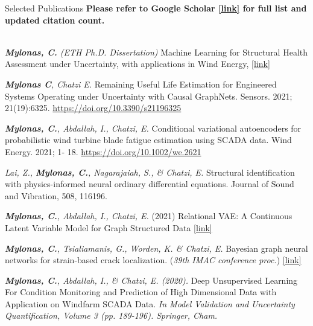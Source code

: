\documentclass{resume_v2} %
\begin{document}
\begin{rSection}{Selected Publications}
  \newcommand{\myvspace}{\vspace{-3pt}}
\def\arraystretch{1.0}
\textbf{Please refer to  Google Scholar \href{https://scholar.google.com/citations?user=W7giwJEAAAAJ}{[link]} for full list and updated citation count.} \\ \\
  \small{
    \textit{\textbf{Mylonas, C.} (ETH Ph.D. Dissertation)} Machine Learning for Structural Health Assessment under Uncertainty, with applications in Wind Energy, \href{https://www.research-collection.ethz.ch/handle/20.500.11850/511551}{[link]}

    \textit{\textbf{Mylonas C}, Chatzi E.} Remaining Useful Life Estimation for Engineered Systems Operating under Uncertainty with Causal GraphNets. Sensors. 2021; 21(19):6325. \href{https://doi.org/10.3390/s21196325}{https://doi.org/10.3390/s21196325}

    \textit{\textbf{Mylonas, C.}, Abdallah, I., Chatzi, E.} Conditional variational autoencoders for probabilistic wind turbine blade fatigue estimation using SCADA data. Wind Energy. 2021; 1‐ 18. \href{https://doi.org/10.1002/we.2621}{https://doi.org/10.1002/we.2621}


 \textit{Lai, Z., \textbf{Mylonas, C.}, Nagarajaiah, S., \& Chatzi, E.} Structural identification with physics-informed neural ordinary differential equations. Journal of Sound and Vibration, 508, 116196. 

    \textit{\textbf{Mylonas, C.}, Abdallah, I., Chatzi, E.} (2021) Relational VAE: A Continuous Latent Variable Model for 
    Graph Structured Data \href{https://arxiv.org/abs/2106.16049}{[link]}

\textit{\textbf{Mylonas, C.}, Tsialiamanis, G., Worden, K. \& Chatzi, E. } Bayesian graph neural networks for 
strain-based crack localization.  (\textit{39th IMAC conference proc.}) \href{https://arxiv.org/abs/2012.06791}{[link]}

\textit{\textbf{Mylonas, C.}, Abdallah, I., \& Chatzi, E. (2020).} Deep Unsupervised Learning For Condition
Monitoring and Prediction of High Dimensional Data with Application on Windfarm SCADA Data. \textit{In Model Validation and Uncertainty Quantification, Volume 3 (pp. 189-196).} \textit{Springer, Cham.}
}

\end{rSection}
\end{document}
